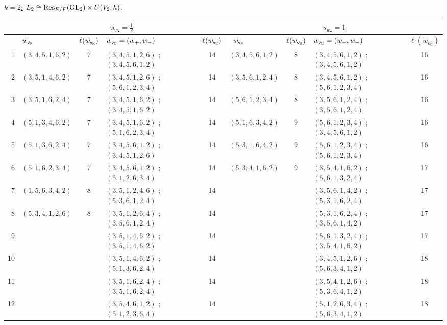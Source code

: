 \documentclass[a4paper,10pt]{amsart}
\theoremstyle{definition}
\numberwithin{equation}{section}
\def\GL{{\rm GL}}
\def\vv{{\sf v}} %
\begin{document}
\newpage\small\enlargethispage{2cm}
\noindent\underline{$k=2$:} $L_2\cong {\rm Res}_{E/F}(\GL_2) \times U(V_2,h)$. 
\begin{center}
\tiny
\setlength{\tabcolsep}{2pt}\renewcommand{\arraystretch}{1.06}
\begin{longtable}{r p{1.78cm} c p{4cm} c | p{1.78cm} c p{4.15cm} c}
\toprule
& \multicolumn{4}{c|}{$s_{w_\bullet}=\frac12$} & \multicolumn{4}{c}{$s_{w_\bullet}=1$}\\
\midrule
& \(w_{\vv_{\mathbb R}}\)  & $\ell(w_{\vv_{\mathbb R}} )$ & \quad $w_{\vv_{\mathbb C}}=(w_+, w_-)$ & $\ell(w_{\vv_{\mathbb C}})$ & \ \(w_{\vv_{\mathbb R}}\)  & $\ell(w_{\vv_{\mathbb R}} )$ & \quad $w_{\vv_{\mathbb C}}=(w_+, w_-)$ & \(\ell(w_{v_{\mathbb C}})\)\\
\midrule
\endhead
1 & $(3,4,5,1,6,2)$ & 7 & $(3,4,5,1,2,6)$ ; $(3,4,5,6,1,2)$ & 14 & $(3,4,5,6,1,2)$ & 8 & $(3,4,5,6,1,2)$ ; $(3,4,5,6,1,2)$ & 16 \\
2 & $(3,5,1,4,6,2)$ & 7 & $(3,4,5,1,2,6)$ ; $(5,6,1,2,3,4)$ & 14 & $(3,5,6,1,2,4)$ & 8 & $(3,4,5,6,1,2)$ ; $(5,6,1,2,3,4)$ & 16 \\
3 & $(3,5,1,6,2,4)$ & 7 & $(3,4,5,1,6,2)$ ; $(3,4,5,1,6,2)$ & 14 & $(5,6,1,2,3,4)$ & 8 & $(3,5,6,1,2,4)$ ; $(3,5,6,1,2,4)$ & 16 \\
4 & $(5,1,3,4,6,2)$ & 7 & $(3,4,5,1,6,2)$ ; $(5,1,6,2,3,4)$ & 14 & $(5,1,6,3,4,2)$ & 9 & $(5,6,1,2,3,4)$ ; $(3,4,5,6,1,2)$ & 16 \\
5 & $(5,1,3,6,2,4)$ & 7 & $(3,4,5,6,1,2)$ ; $(3,4,5,1,2,6)$ & 14 & $(5,3,1,6,4,2)$ & 9 & $(5,6,1,2,3,4)$ ; $(5,6,1,2,3,4)$ & 16 \\
6 & $(5,1,6,2,3,4)$ & 7 & $(3,4,5,6,1,2)$ ; $(5,1,2,6,3,4)$ & 14 & $(5,3,4,1,6,2)$ & 9 & $(3,5,4,1,6,2)$ ; $(5,6,1,3,2,4)$ & 17 \\
7 & $(1,5,6,3,4,2)$ & 8 & $(3,5,1,2,4,6)$ ; $(5,3,6,1,2,4)$ & 14 &  &  & $(3,5,6,1,4,2)$ ; $(5,3,1,6,2,4)$ & 17 \\
8 & $(5,3,4,1,2,6)$ & 8 & $(3,5,1,2,6,4)$ ; $(3,5,6,1,2,4)$ & 14 &  &  & $(5,3,1,6,2,4)$ ; $(3,5,6,1,4,2)$ & 17 \\
9 &  &  & $(3,5,1,4,6,2)$ ; $(3,5,1,4,6,2)$ & 14 &  &  & $(5,6,1,3,2,4)$ ; $(3,5,4,1,6,2)$ & 17 \\
10 &  &  & $(3,5,1,4,6,2)$ ; $(5,1,3,6,2,4)$ & 14 &  &  & $(3,4,5,1,2,6)$ ; $(5,6,3,4,1,2)$ & 18 \\
11 &  &  & $(3,5,1,6,2,4)$ ; $(3,5,1,6,2,4)$ & 14 &  &  & $(3,5,4,1,2,6)$ ; $(5,3,6,4,1,2)$ & 18 \\
12 &  &  & $(3,5,4,6,1,2)$ ; $(5,1,2,3,6,4)$ & 14 &  &  & $(5,1,2,6,3,4)$ ; $(5,6,3,4,1,2)$ & 18 \\

\end{longtable}
\end{center}
\end{document}
